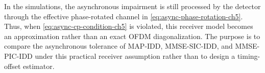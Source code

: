 
In the simulations, the asynchronous impairment is still processed by the detector through the effective phase-rotated channel in \eqref{eq:async-phase-rotation-ch5}. Thus, when \eqref{eq:async-cp-condition-ch5} is violated, this receiver model becomes an approximation rather than an exact OFDM diagonalization. The purpose is to compare the asynchronous tolerance of MAP-IDD, MMSE-SIC-IDD, and MMSE-PIC-IDD under this practical receiver assumption rather than to design a timing-offset estimator.


